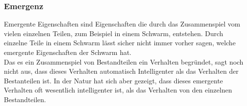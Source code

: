 		\subsubsection{Emergenz}
		Emergente Eigenschaften sind Eigenschaften die durch das Zusammenspiel vom vielen einzelnen Teilen, zum Beispiel in einem Schwarm, entstehen. Durch einzelne Teile in einem Schwarm lässt sicher nicht immer vorher sagen, welche emergente Eigenschaften der Schwarm hat. \\
		Das es ein Zusammenspiel von Bestandteilen ein Verhalten begründet, sagt noch nicht aus, dass dieses Verhalten automatisch Intelligenter als das Verhalten der Bestanteilen ist. In der Natur hat sich aber gezeigt, dass dieses emergente Verhalten oft wesentlich intelligenter ist, als das Verhalten von den einzelnen Bestandteilen.
